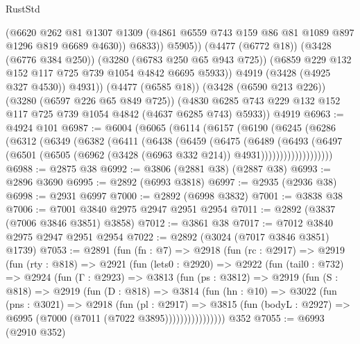 \begin{lexlean}{RustStd}
\begin{coremodule}
                    (@6620
                      @262
                      @81
                      @1307
                      @1309
                      (@4861 @6559 @743 @159 @86 @81 @1089 @897 @1296 @819 @6689 @4630))
                    @6833))
                @5905))
            (@4477 (@6772 @18))
            (@3428 (@6776 @384 @250))
            (@3280 (@6783 @250 @65 @943 @725))
            (@6859 @229 @132 @152 @117 @725 @739 @1054 @4842 @6695 @5933))
          @4919
          (@3428 (@4925 @327 @4530))
          @4931))
      (@4477 (@6585 @18))
      (@3428 (@6590 @213 @226))
      (@3280 (@6597 @226 @65 @849 @725))
      (@4830 @6285 @743 @229 @132 @152 @117 @725 @739 @1054 @4842 (@4637 @6285 @743) @5933))
    @4919
@6963 := @4924 @101
@6987 := @6004
    (@6065
      (@6114
        (@6157
          (@6190
            (@6245
              (@6286
                (@6312
                  (@6349
                    (@6382
                      (@6411
                        (@6438
                          (@6459
                            (@6475
                              (@6489
                                (@6493
                                  (@6497
                                    (@6501
                                      (@6505
                                        (@6962 (@3428 (@6963 @332 @214)) @4931)))))))))))))))))))
@6988 := @2875 @38
@6992 := @3806 (@2881 @38) (@2887 @38)
@6993 := @2896 @3690
@6995 := @2892 (@6993 @3818)
@6997 := @2935 (@2936 @38)
@6998 := @2931 @6997
@7000 := @2892 (@6998 @3832)
@7001 := @3838 @38
@7006 := @7001 @3840 @2975 @2947 @2951 @2954
@7011 := @2892 (@3837 (@7006 @3846 @3851) @3858)
@7012 := @3861 @38
@7017 := @7012 @3840 @2975 @2947 @2951 @2954
@7022 := @2892 (@3024 (@7017 @3846 @3851) @1739)
@7053 := @2891
    (fun (fn : @7) =>
    @2918
      (fun (rc : @2917) =>
      @2919
        (fun (rty : @818) =>
        @2921
          (fun (lets0 : @2920) =>
          @2922
            (fun (tail0 : @732) =>
            @2924
              (fun (Γ : @2923) =>
              @3813
                (fun (ps : @3812) =>
                @2919
                  (fun (S : @818) =>
                  @2919
                    (fun (D : @818) =>
                    @3814
                      (fun (hn : @10) =>
                      @3022
                        (fun (pns : @3021) =>
                        @2918
                          (fun (pl : @2917) =>
                          @3815
                            (fun (bodyL : @2927) => @6995 (@7000 (@7011 (@7022 @3895))))))))))))))))
    @352
@7055 := @6993 (@2910 @352)

\end{coremodule}
\end{lexlean}
